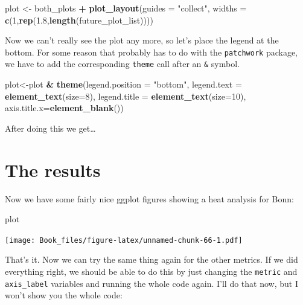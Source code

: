 \documentclass[
]{book}
\newenvironment{Shaded}{\begin{snugshade}}{\end{snugshade}}
\newcommand{\DataTypeTok}[1]{\textcolor[rgb]{0.13,0.29,0.53}{#1}}
\newcommand{\DecValTok}[1]{\textcolor[rgb]{0.00,0.00,0.81}{#1}}
\newcommand{\FloatTok}[1]{\textcolor[rgb]{0.00,0.00,0.81}{#1}}
\newcommand{\KeywordTok}[1]{\textcolor[rgb]{0.13,0.29,0.53}{\textbf{#1}}}
\newcommand{\NormalTok}[1]{#1}
\newcommand{\OperatorTok}[1]{\textcolor[rgb]{0.81,0.36,0.00}{\textbf{#1}}}
\newcommand{\StringTok}[1]{\textcolor[rgb]{0.31,0.60,0.02}{#1}}
\begin{document}
\begin{Shaded}
\begin{Highlighting}[]
\NormalTok{plot <-}\StringTok{ }\NormalTok{both_plots }\OperatorTok{+}
\StringTok{           }\KeywordTok{plot_layout}\NormalTok{(}\DataTypeTok{guides =} \StringTok{"collect"}\NormalTok{,}
                       \DataTypeTok{widths =} \KeywordTok{c}\NormalTok{(}\DecValTok{1}\NormalTok{,}\KeywordTok{rep}\NormalTok{(}\FloatTok{1.8}\NormalTok{,}\KeywordTok{length}\NormalTok{(future_plot_list))))}
\end{Highlighting}
\end{Shaded}

Now we can't really see the plot any more, so let's place the legend at the bottom. For some reason that probably has to do with the \texttt{patchwork} package, we have to add the corresponding \texttt{theme} call after an \texttt{\&} symbol.

\begin{Shaded}
\begin{Highlighting}[]
\NormalTok{plot<-plot }\OperatorTok{&}\StringTok{ }\KeywordTok{theme}\NormalTok{(}\DataTypeTok{legend.position =} \StringTok{"bottom"}\NormalTok{,}
                 \DataTypeTok{legend.text =} \KeywordTok{element_text}\NormalTok{(}\DataTypeTok{size=}\DecValTok{8}\NormalTok{),}
                 \DataTypeTok{legend.title =} \KeywordTok{element_text}\NormalTok{(}\DataTypeTok{size=}\DecValTok{10}\NormalTok{),}
                 \DataTypeTok{axis.title.x=}\KeywordTok{element_blank}\NormalTok{())}
\end{Highlighting}
\end{Shaded}

After doing this we get\ldots{}

\hypertarget{the-results}{%
\section{The results}\label{the-results}}

Now we have some fairly nice ggplot figures showing a heat analysis for Bonn:

\begin{Shaded}
\begin{Highlighting}[]
\NormalTok{plot}
\end{Highlighting}
\end{Shaded}

\texttt{[image: Book\_files/figure-latex/unnamed-chunk-66-1.pdf]}

That's it. Now we can try the same thing again for the other metrics. If we did everything right, we should be able to do this by just changing the \texttt{metric} and \texttt{axis\_label} variables and running the whole code again. I'll do that now, but I won't show you the whole code:
\end{document}
